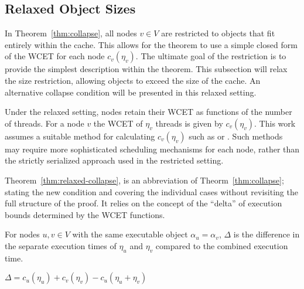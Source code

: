 \subsection{Relaxed Object Sizes}

In Theorem~\ref{thm:collapse}, all nodes ${v \in V}$ are restricted to
objects that fit entirely within the cache. This allows for the theorem
to use a simple closed form of the WCET for each node
${c_v(\eta_v)}$. The ultimate goal of the restriction is to provide the
simplest description within the theorem. This subsection will relax
the size restriction, allowing objects to exceed the size of the
cache. An alternative collapse condition will be presented in this
relaxed setting.

Under the relaxed setting, nodes retain their WCET as functions of the
number of threads. For a node ${v}$ the WCET of ${\eta_v}$ threads is
given by ${c_v(\eta_v)}$. This work assumes a suitable method for
calculating ${c_v(\eta_v)}$ such as \bundle{} or \bundlep{}
\addcite. Such methods may require more sophisticated scheduling
mechanisms for each node, rather than the strictly serialized approach 
used in the restricted setting.

Theorem~\ref{thm:relaxed-collapse}, is an abbreviation of
Theorm~\ref{thm:collapse}; stating the new condition and covering the
individual cases without revisiting the full structure of the
proof. It relies on the concept of the ``delta'' of execution bounds
determined by the WCET functions. 

\begin{definition}
  For nodes ${u, v \in V}$ with the same executable object ${\alpha_u
    = \alpha_v}$, ${\Delta}$ is the difference in the separate
  execution times of ${\eta_u}$ and ${\eta_v}$ compared to the
  combined execution time. 

  ${\Delta = c_u(\eta_u) + c_v(\eta_v) - c_u(\eta_u + \eta_v)}$
\end{definition}


